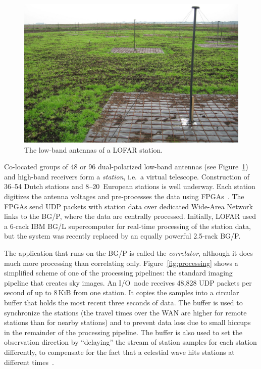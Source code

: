 \documentclass[conference]{worldcomp}
\begin{document}
\addtocounter{figure}{-2}
\begin{figure}[h]
\begin{center}
\includegraphics[width=.7\columnwidth]{station.jpg}
\end{center}
\caption{The low-band antennas of a LOFAR station.}
\label{fig:station}
\end{figure}
\addtocounter{figure}{1}

Co-located groups of 48 or 96 dual-polarized low-band antennas (see
Figure~\ref{fig:station}) and high-band receivers form a \emph{station},
i.e.\ a virtual telescope.
Construction of 36--54 Dutch stations and 8--20~European stations is well
underway.
Each station digitizes the antenna voltages and pre-processes the data using
FPGAs~\cite{Gunst:07}.
The FPGAs send UDP packets with station data over dedicated Wide-Area
Network links to the BG/P, where the data are centrally processed.
Initially, LOFAR used a 6-rack IBM BG/L supercomputer for real-time
processing of the station data, but the system was recently replaced by an
equally powerful 2.5-rack BG/P.

The application that runs on the BG/P is called the \emph{correlator},
although it does much more processing than correlating only.
Figure~\ref{fig:processing} shows a simplified scheme of one of the processing
pipelines: the standard imaging pipeline that creates sky images.
An I/O~node receives 48,828 UDP packets per second of up to 8\,KiB from one
station.
It copies the samples into a circular buffer that holds the most recent
three seconds of data.
The buffer is used to synchronize the stations (the travel times over the
WAN are higher for remote stations than for nearby stations) and to prevent
data loss due to small hiccups in the remainder of the processing pipeline.
The buffer is also used to set the observation direction by ``delaying''
the stream of station samples for each station differently, to compensate for
the fact that a celestial wave hits stations at different
times~\cite[Sec.~2.1]{Romein:06}.
\end{document}

